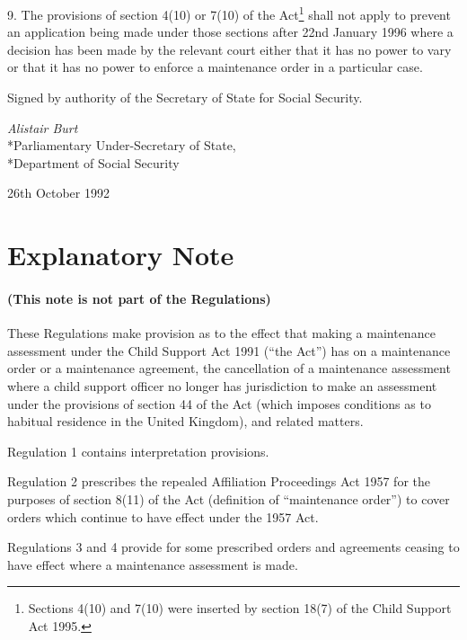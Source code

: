 \documentclass[12pt,a4paper]{article}
\begin{document}
9.  The provisions of section 4(10) or 7(10) of the Act\footnote{\frenchspacing Sections 4(10) and 7(10) were inserted by section 18(7) of the Child Support Act 1995.} shall not apply to prevent an application being made under those sections after 22nd January 1996 where a decision has been made by the relevant court either that it has no power to vary or that it has no power to enforce a maintenance order in a particular case.


\bigskip

Signed by authority of the Secretary of State for Social Security.

{\raggedleft
\emph{Alistair Burt}\\*Parliamentary Under-Secretary of State,\\*Department of Social Security

}

26th October 1992

\small

\part{Explanatory Note}

\renewcommand\parthead{--- Explanatory Note}

\subsection*{(This note is not part of the Regulations)}

 These Regulations make provision as to the effect that making a maintenance assessment under the Child Support Act 1991 (“the Act”) has on a maintenance order or a maintenance agreement, the cancellation of a maintenance assessment where a child support officer no longer has jurisdiction to make an assessment under the provisions of section 44 of the Act (which imposes conditions as to habitual residence in the United Kingdom), and related matters.

  Regulation 1 contains interpretation provisions.

  Regulation 2 prescribes the repealed Affiliation Proceedings Act 1957 for the purposes of section 8(11) of the Act (definition of “maintenance order”) to cover orders which continue to have effect under the 1957 Act.

  Regulations 3 and 4 provide for some prescribed orders and agreements ceasing to have effect where a maintenance assessment is made.
\end{document}
